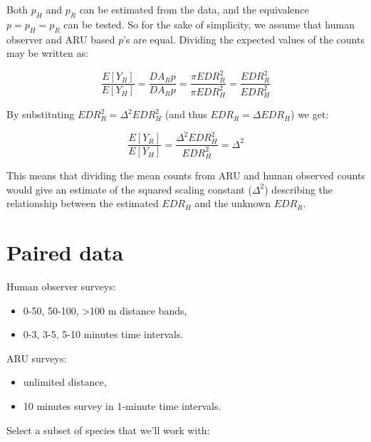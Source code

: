 \documentclass[12pt,]{book}
\providecommand{\tightlist}{%
  \setlength{\itemsep}{0pt}\setlength{\parskip}{0pt}}
\begin{document}
Both \(p_{H}\) and \(p_{R}\) can be estimated from the data, and the equivalence
\(p=p_{H}=p_{R}\) can be tested. So for the sake of simplicity, we assume that
human observer and ARU based \(p\)'s are equal.
Dividing the expected values of the counts may be written as:

\[\frac{E[Y_{R}]}{E[Y_{H}]} = \frac{D A_{R} p}{D A_{R} p} = \frac{\pi EDR_{R}^2}{\pi EDR_{H}^2} = \frac{EDR_{R}^2}{EDR_{H}^2}\]

By substituting \(EDR_{R}^2 = \Delta^2 EDR_{H}^2\) (and thus \(EDR_{R} = \Delta EDR_{H}\)) we get:

\[\frac{E[Y_{R}]}{E[Y_{H}]} = \frac{\Delta^2 EDR_{H}^2}{EDR_{H}^2} = \Delta^2\]

This means that dividing the mean counts from ARU and human observed counts
would give an estimate of the squared scaling constant (\(\Delta^2\)) describing the
relationship between the estimated \(EDR_{H}\) and the unknown \(EDR_{R}\).

\hypertarget{paired-data}{%
\section{Paired data}\label{paired-data}}

Human observer surveys:

\begin{itemize}
\tightlist
\item
  0-50, 50-100, \textgreater{}100 m distance bands,
\item
  0-3, 3-5, 5-10 minutes time intervals.
\end{itemize}

ARU surveys:

\begin{itemize}
\tightlist
\item
  unlimited distance,
\item
  10 minutes survey in 1-minute time intervals.
\end{itemize}

Select a subset of species that we'll work with:
\end{document}
